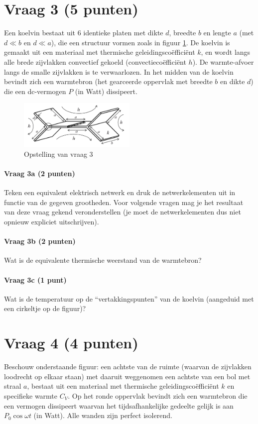 \documentclass[a4paper]{article}
\begin{document}
\section*{Vraag 3 (5 punten)}
Een koelvin bestaat uit 6 identieke platen met dikte $d$, breedte $b$ en lengte $a$ (met $d \ll b$
en $d \ll a$), die een structuur vormen zoals in figuur \ref{fig:vraag3}. De koelvin is gemaakt uit een materiaal met thermische geleidingscoëfficiënt $k$, en wordt langs alle brede zijvlakken convectief gekoeld (convectiecoëfficiënt $h$). De warmte-afvoer langs de smalle zijvlakken is te verwaarlozen. In het midden van de koelvin bevindt zich een warmtebron (het gearceerde oppervlak met breedte $b$ en dikte $d$) die een dc-vermogen $P$ (in Watt) dissipeert.

\begin{figure}[ht]
    \centering
    \includegraphics[width=0.5\textwidth]{vraag3}
    \caption{Opstelling van vraag 3}
    \label{fig:vraag3}
\end{figure}

\paragraph{Vraag 3a (2 punten)}
Teken een equivalent elektrisch netwerk en druk de netwerkelementen uit in functie van de gegeven grootheden. Voor volgende vragen mag je het resultaat van deze vraag gekend veronderstellen (je moet de netwerkelementen dus niet opnieuw expliciet uitschrijven).

\paragraph{Vraag 3b (2 punten)}
Wat is de equivalente thermische weerstand van de warmtebron?

\paragraph{Vraag 3c (1 punt)}
Wat is de temperatuur op de “vertakkingspunten” van de koelvin (aangeduid met een cirkeltje op de figuur)?

\section*{Vraag 4 (4 punten)}
Beschouw onderstaande figuur: een achtste van de ruimte (waarvan de zijvlakken loodrecht op elkaar staan) met daaruit weggenomen een achtste van een bol met straal $a$, bestaat uit een materiaal met thermische geleidingscoëfficiënt $k$ en specifieke warmte $C_V$. Op het ronde oppervlak bevindt zich een warmtebron die een vermogen dissipeert waarvan het tijdsafhankelijke gedeelte gelijk is aan $P_0\cos{\omega t}$ (in Watt). Alle wanden zijn perfect isolerend.
\end{document}
